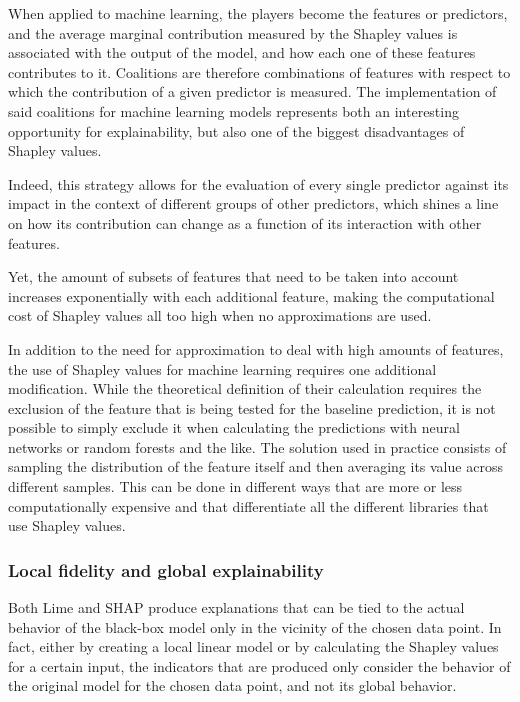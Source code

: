 When applied to machine learning, the players become the features or predictors, and the average marginal contribution measured by the Shapley values is associated with the output of the model, and how each one of these features contributes to it. Coalitions are therefore combinations of features with respect to which the contribution of a given predictor is measured. 
The implementation of said coalitions for machine learning models represents both an interesting opportunity for explainability, but also one of the biggest disadvantages of Shapley values. 

Indeed, this strategy allows for the evaluation of every single predictor against its impact in the context of different groups of other predictors, which shines a line on how its contribution can change as a function of its interaction with other features. 

Yet, the amount of subsets of features that need to be taken into account increases exponentially with each additional feature, making the computational cost of Shapley values all too high when no approximations are used.

In addition to the need for approximation to deal with high amounts of features, the use of Shapley values for machine learning requires one additional modification. While the theoretical definition of their calculation requires the exclusion of the feature that is being tested for the baseline prediction, it is not possible to simply exclude it when calculating the predictions with neural networks or random forests and the like. The solution used in practice consists of sampling the distribution of the feature itself and then averaging its value across different samples. This can be done in different ways that are more or less computationally expensive and that differentiate all the different libraries that use Shapley values. 

\subsubsection{Local fidelity and global explainability}

Both Lime and SHAP produce explanations that can be tied to the actual behavior of the black-box model only in the vicinity of the chosen data point. In fact, either by creating a local linear model or by calculating the Shapley values for a certain input, the indicators that are produced only consider the behavior of the original model for the chosen data point, and not its global behavior.

